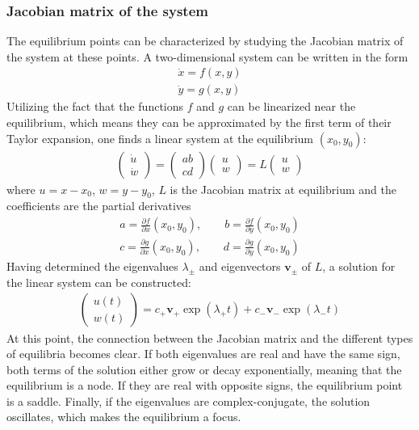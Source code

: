 \documentclass[12pt,a4paper]{article}
\begin{document}
\subsubsection{Jacobian matrix of the system}
The equilibrium points can be characterized by studying the Jacobian matrix of the system at these points. A two-dimensional system can be written in the form
\begin{align}
\dot{x}=f(x,y)\\
\dot{y}=g(x,y)
\end{align}
Utilizing the fact that the functions $f$ and $g$ can be linearized near the equilibrium, which means they can be approximated by the first term of their Taylor expansion, one finds a linear system at the equilibrium $(x_0,y_0)$:
\begin{align}				
\left(\begin{matrix}\dot{u}\\\dot{w}
\end{matrix}\right)
=\left(\begin{matrix}a b\\
c d\end{matrix}\right)\left(\begin{matrix}u\\w\end{matrix}\right)=L\left(\begin{matrix}u\\w\end{matrix}\right)
\end{align}
where $u=x-x_0$, $w=y-y_0$, $L$ is the Jacobian matrix at equilibrium and the coefficients are the partial derivatives
\begin{align}
a=\frac{\partial f}{\partial x}(x_0,y_0),\qquad b=\frac{\partial f}{\partial y}(x_0,y_0) \\
c=\frac{\partial g}{\partial x}(x_0,y_0),\qquad d=\frac{\partial g}{\partial y}(x_0,y_0)
\end{align} 
Having determined the eigenvalues $\lambda_\pm$ and eigenvectors $ \boldsymbol{v_\pm}$ of $L$, a solution for the linear system can be constructed:
\begin{align}
\left(\begin{matrix}u(t)\\w(t)
\end{matrix}\right)=c_+\boldsymbol{v_+}\exp(\lambda_+t)+c_-\boldsymbol{v_-}\exp(\lambda_-t)
\end{align}
At this point, the connection between the Jacobian matrix and the different types of equilibria becomes clear. If both eigenvalues are real and have the same sign, both terms of the solution either grow or decay exponentially, meaning that the equilibrium is a node. If they are real with opposite signs, the equilibrium point is a saddle. Finally, if the eigenvalues are complex-conjugate, the solution oscillates, which makes the equilibrium a focus\cite{izi}.\\
\end{document}
